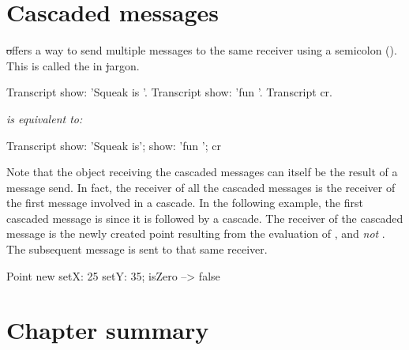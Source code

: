 \documentclass[a4paper,10pt,twoside]{book}
\begin{document}
\section{Cascaded messages}
\st offers a way to send multiple messages to the same receiver using a semicolon (\ct{;}).
This is called the  in \st jargon.


\begin{minipage}{0.3\textwidth}
\begin{code}{}
Transcript show: 'Squeak is '.
Transcript show: 'fun '.
Transcript cr.
\end{code}
\end{minipage}
\emph{is equivalent to:}
\begin{minipage}{0.3\textwidth}
\begin{code}{}
Transcript        
   show: 'Squeak is';
   show: 'fun ';
   cr
\end{code}
\end{minipage}

Note that the object receiving the cascaded messages can itself be the result of a message send. 
In fact, the receiver of all the cascaded messages is the receiver of the first message involved in a cascade.
In the following example, the first cascaded message is  since it is followed by a cascade.
The receiver of the cascaded message  is the newly created point resulting from the evaluation of , and \emph{not} .
The subsequent message  is sent to that same receiver.

\begin{code}{}
Point new setX: 25 setY: 35; isZero --> false
\end{code}

\section{Chapter summary}
\end{document}
